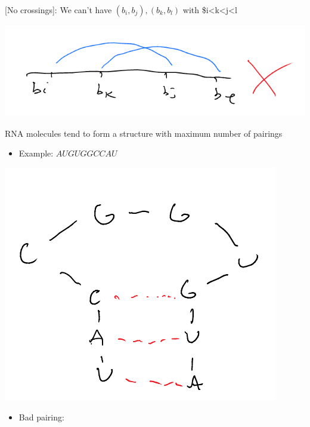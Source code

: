 \documentclass[11pt]{article}
\begin{document}
[No crossings]: We can't have \((b_i,b_j),(b_k,b_l)\) with \$i<k<j<l
\begin{center}
\includegraphics[width=.9\linewidth]{./Images/i88.png}
\end{center}
RNA molecules tend to form a structure with maximum number of pairings
\begin{itemize}
\item Example: \(AUGUGGCCAU\)
\end{itemize}
\begin{center}
\includegraphics[width=.9\linewidth]{./Images/i89.png}
\end{center}
\begin{itemize}
\item Bad pairing:
\end{itemize}
\end{document}
